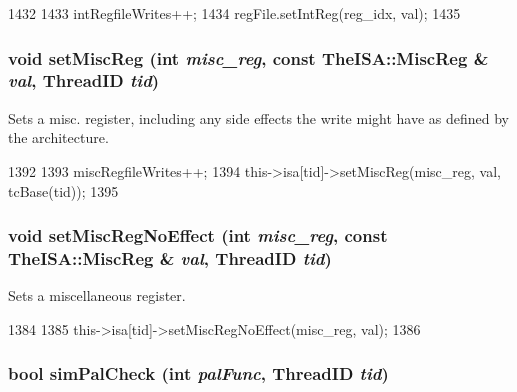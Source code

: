 \begin{DoxyCode}
1432 {
1433     intRegfileWrites++;
1434     regFile.setIntReg(reg_idx, val);
1435 }
\end{DoxyCode}
\hypertarget{classFullO3CPU_a880c4c099ed7676fcbc9f76989e400b7}{
\subsubsection[{setMiscReg}]{\setlength{\rightskip}{0pt plus 5cm}void setMiscReg (int {\em misc\_\-reg}, \/  const TheISA::MiscReg \& {\em val}, \/  {\bf ThreadID} {\em tid})}}
\label{classFullO3CPU_a880c4c099ed7676fcbc9f76989e400b7}
Sets a misc. register, including any side effects the write might have as defined by the architecture. 


\begin{DoxyCode}
1392 {
1393     miscRegfileWrites++;
1394     this->isa[tid]->setMiscReg(misc_reg, val, tcBase(tid));
1395 }
\end{DoxyCode}
\hypertarget{classFullO3CPU_acd6f1f298148bb7eebfa8c800c4066e2}{
\subsubsection[{setMiscRegNoEffect}]{\setlength{\rightskip}{0pt plus 5cm}void setMiscRegNoEffect (int {\em misc\_\-reg}, \/  const TheISA::MiscReg \& {\em val}, \/  {\bf ThreadID} {\em tid})}}
\label{classFullO3CPU_acd6f1f298148bb7eebfa8c800c4066e2}
Sets a miscellaneous register. 


\begin{DoxyCode}
1384 {
1385     this->isa[tid]->setMiscRegNoEffect(misc_reg, val);
1386 }
\end{DoxyCode}
\hypertarget{classFullO3CPU_a875eebdeba298f450fe84b0a05349afe}{
\subsubsection[{simPalCheck}]{\setlength{\rightskip}{0pt plus 5cm}bool simPalCheck (int {\em palFunc}, \/  {\bf ThreadID} {\em tid})}}
\label{classFullO3CPU_a875eebdeba298f450fe84b0a05349afe}



